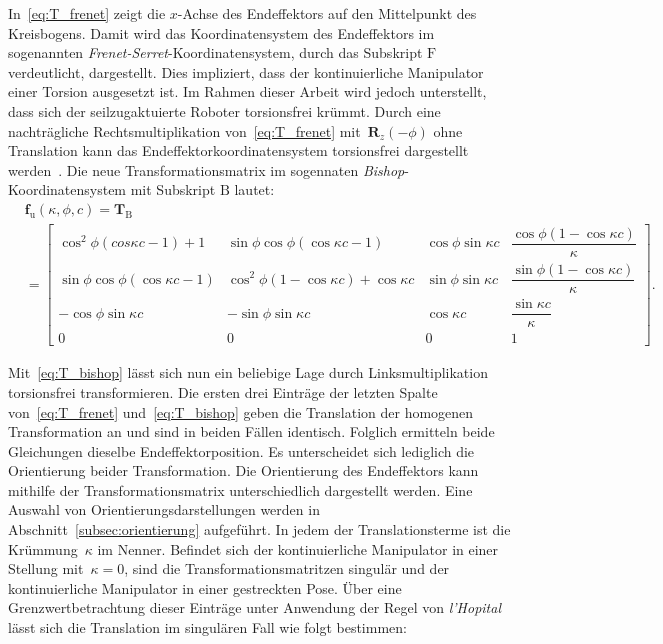 In~\eqref{eq:T_frenet} zeigt die \mbox{$x$-Achse} des Endeffektors auf den Mittelpunkt des Kreisbogens. Damit wird das Koordinatensystem des Endeffektors im sogenannten \textit{Frenet-Serret}-Koordinatensystem, durch das Subskript $\mathrm{F}$ verdeutlicht, dargestellt. Dies impliziert, dass der kontinuierliche Manipulator einer Torsion ausgesetzt ist. Im Rahmen dieser Arbeit wird jedoch unterstellt, dass sich der seilzugaktuierte Roboter torsionsfrei krümmt. Durch eine nachträgliche Rechtsmultiplikation von~\eqref{eq:T_frenet} \mbox{mit $\bm{R}_z(-\phi)$} ohne Translation kann das Endeffektorkoordinatensystem torsionsfrei dargestellt werden~\cite{WIJ10}. Die neue Transformationsmatrix im sogennaten \textit{Bishop}-Koordinatensystem mit Subskript $\mathrm{B}$ lautet:
\begin{align}
&\bm{f}_{\mathrm{u}} (\kappa, \phi, c) = \bm{T}_\mathrm{B} \nonumber \\
&=\begin{bmatrix}
\cos^2\phi(cos\kappa c- 1)+1 & \sin\phi\cos\phi (\cos\kappa c -1) & \cos\phi \sin\kappa c & \dfrac{\cos\phi(1-\cos\kappa c)}{\kappa} \\
\sin\phi \cos\phi (\cos\kappa c-1) & \cos^2\phi(1-\cos\kappa c)+\cos\kappa c & \sin\phi \sin\kappa c & \dfrac{\sin\phi(1-\cos\kappa c)}{\kappa} \\
-\cos\phi \sin\kappa c & -\sin\phi \sin\kappa c & \cos\kappa c & \dfrac{\sin\kappa c}{\kappa} \\
0 & 0 & 0 & 1
\end{bmatrix}.
\label{eq:T_bishop}
\end{align}

Mit~\eqref{eq:T_bishop} lässt sich nun ein beliebige Lage durch Linksmultiplikation torsionsfrei transformieren. 
Die ersten drei Einträge der letzten Spalte von~\eqref{eq:T_frenet} und~\eqref{eq:T_bishop} geben die  Translation der homogenen Transformation an und sind in beiden Fällen identisch. Folglich ermitteln beide Gleichungen dieselbe Endeffektorposition. Es unterscheidet sich lediglich die Orientierung beider Transformation. 
Die Orientierung des Endeffektors kann mithilfe der Transformationsmatrix unterschiedlich dargestellt werden. Eine Auswahl von Orientierungsdarstellungen werden in Abschnitt~\ref{subsec:orientierung} aufgeführt. 
In jedem der Translationsterme ist die Krümmung~$\kappa$ im Nenner. Befindet sich der kontinuierliche Manipulator in einer Stellung mit~$\kappa=0$, sind die Transformationsmatritzen singulär und der kontinuierliche Manipulator in einer gestreckten Pose. Über eine Grenzwertbetrachtung dieser Einträge unter Anwendung der Regel von \textit{l'Hopital} lässt sich die Translation im singulären Fall wie folgt bestimmen:

